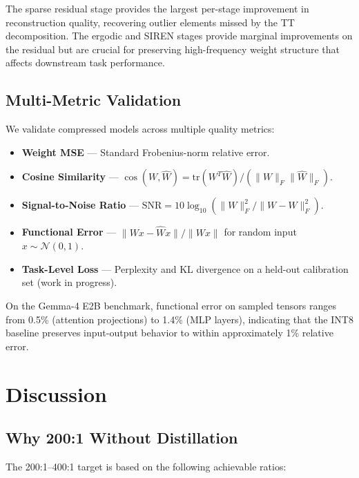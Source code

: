 \documentclass[11pt,a4paper]{article}
\begin{document}
The sparse residual stage provides the largest per-stage improvement in reconstruction
quality, recovering outlier elements missed by the TT decomposition. The ergodic and
SIREN stages provide marginal improvements on the residual but are crucial for
preserving high-frequency weight structure that affects downstream task performance.

\subsection{Multi-Metric Validation}

We validate compressed models across multiple quality metrics:

\begin{itemize}
	\item \textbf{Weight MSE} --- Standard Frobenius-norm relative error.
	\item \textbf{Cosine Similarity} --- $\cos(W, \hat{W}) =
		      \text{tr}(W^T \hat{W}) / (\|W\|_F \|\hat{W}\|_F)$.
	\item \textbf{Signal-to-Noise Ratio} --- $\text{SNR} = 10 \log_{10}
		      (\|W\|_F^2 / \|W - \hat{W}\|_F^2)$.
	\item \textbf{Functional Error} --- $\|Wx - \hat{W}x\| / \|Wx\|$ for random
	      input $x \sim \mathcal{N}(0, 1)$.
	\item \textbf{Task-Level Loss} --- Perplexity and KL divergence on a held-out
	      calibration set (work in progress).
\end{itemize}

On the Gemma-4 E2B benchmark, functional error on sampled tensors ranges from
0.5\% (attention projections) to 1.4\% (MLP layers), indicating that the INT8
baseline preserves input-output behavior to within approximately 1\% relative
error.

\section{Discussion}

\subsection{Why 200:1 Without Distillation}

The 200:1--400:1 target is based on the following achievable ratios:
\end{document}
